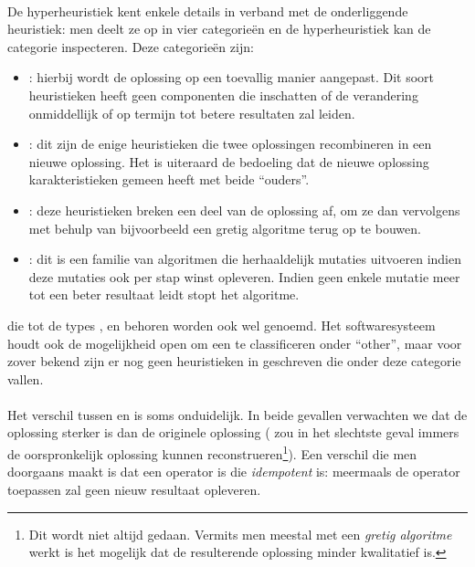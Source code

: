 \paragraph{}
De hyperheuristiek kent enkele details in verband met de onderliggende heuristiek: men deelt ze op in vier categorie\"en en de hyperheuristiek kan de categorie inspecteren. Deze categorie\"en zijn:
\begin{itemize}
 \item \emph{\abmt[M]{}}: hierbij wordt de oplossing op een toevallig manier aangepast. Dit soort heuristieken heeft geen componenten die inschatten of de verandering onmiddellijk of op termijn tot betere resultaten zal leiden.
 \item \emph{\abco[C]{}}: dit zijn de enige heuristieken die twee oplossingen recombineren in een nieuwe oplossing. Het is uiteraard de bedoeling dat de nieuwe oplossing karakteristieken gemeen heeft met beide ``ouders''.
 \item \emph{\abrr[R]{}}: deze heuristieken breken een deel van de oplossing af, om ze dan vervolgens met behulp van bijvoorbeeld een gretig algoritme terug op te bouwen.
 \item \emph{\abls[L]{}}: dit is een familie van algoritmen die herhaaldelijk mutaties uitvoeren indien deze mutaties ook per stap winst opleveren. Indien geen enkele mutatie meer tot een beter resultaat leidt stopt het algoritme.
\end{itemize}
\abllhn[L]{} die tot de types \emph{\abmt{}}, \emph{\abco{}} en \emph{\abrr{}} behoren worden ook wel \emph{\abpts{}} genoemd. Het softwaresysteem houdt ook de mogelijkheid open om een \abllh{} te classificeren onder ``other'', maar voor zover bekend zijn er nog geen heuristieken in \abhf{} geschreven die onder deze categorie vallen.

\paragraph{}
Het verschil tussen \abrr{} en \abls{} is soms onduidelijk. In beide gevallen verwachten we dat de oplossing sterker is dan de originele oplossing (\abrr{} zou in het slechtste geval immers de oorspronkelijk oplossing kunnen reconstrueren\footnote{Dit wordt niet altijd gedaan. Vermits men meestal met een \emph{gretig algoritme} werkt is het mogelijk dat de resulterende oplossing minder kwalitatief is.}). Een verschil die men doorgaans maakt is dat \abls{} een operator is die \emph{idempotent} is: meermaals de operator toepassen zal geen nieuw resultaat opleveren.

